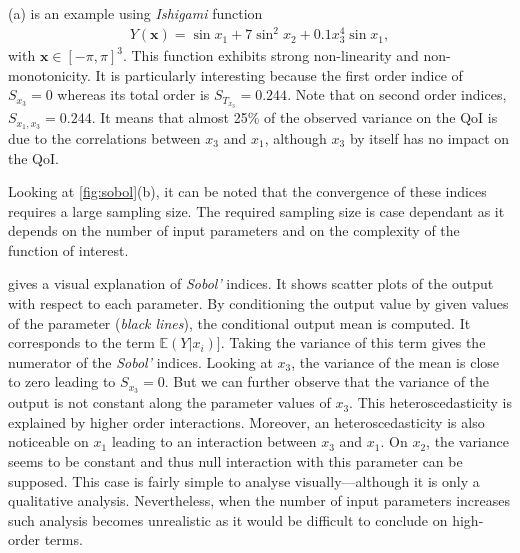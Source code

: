 (a) is an example using \textit{Ishigami} function~\cite{ishigami1990}
\begin{align}
Y(\mathbf{x}) = \sin x_1 + 7 \sin^2 x_2 + 0.1 x_3^4 \sin x_1,
\end{align}
\noindent with $\mathbf{x} \in [-\pi, \pi]^3$. This function exhibits strong non-linearity and non-monotonicity. It is particularly interesting because the first order indice of $S_{x_3} = 0$ whereas its total order is $S_{T_{x_3}} = 0.244$. Note that on second order indices, $S_{x_1,x_3} = 0.244$. It means that almost 25\% of the observed variance on the QoI is due to the correlations between $x_3$ and $x_1$, although $x_3$ by itself has no impact on the QoI.

Looking at \cref{fig:sobol}(b), it can be noted that the convergence of these indices requires a large sampling size. The required sampling size is case dependant as it depends on the number of input parameters and on the complexity of the function of interest.

 gives a visual explanation of \emph{Sobol'} indices. It shows scatter plots of the output with respect to each parameter. By conditioning the output value by given values of the parameter (\emph{black lines}), the conditional output mean is computed. It corresponds to the term $\mathbb{E}(Y|x_i)]$. Taking the variance of this term gives the numerator of the \emph{Sobol'} indices. Looking at $x_3$, the variance of the mean is close to zero leading to $S_{x_3} = 0$. But we can further observe that the variance of the output is not constant along the parameter values of $x_3$. This heteroscedasticity is explained by higher order interactions. Moreover, an heteroscedasticity is also noticeable on $x_1$ leading to an interaction between $x_3$ and $x_1$. On $x_2$, the variance seems to be constant and thus null interaction with this parameter can be supposed. This case is fairly simple to analyse visually---although it is only a qualitative analysis. Nevertheless, when the number of input parameters increases such analysis becomes unrealistic as it would be difficult to conclude on high-order terms.

